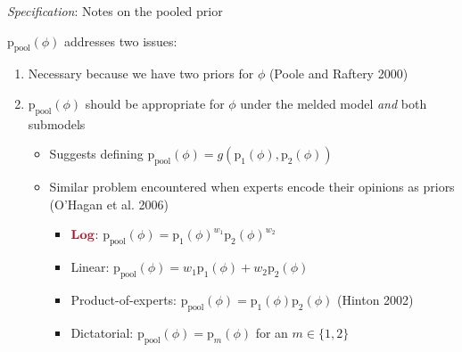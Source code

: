 \documentclass[10pt,ignorenonframetext,]{beamer}
\providecommand{\tightlist}{%
  \setlength{\itemsep}{0pt}\setlength{\parskip}{0pt}}
\newcommand{\pd}{\text{p}}
\newcommand{\ppoolphi}{\pd_{\text{pool}}(\phi)}
\newcommand{\modelindex}{m}
\begin{document}
\begin{frame}{\emph{Specification}: Notes on the pooled prior}

\(\ppoolphi\) addresses two issues:

\begin{enumerate}
\def\labelenumi{\arabic{enumi}.}
\tightlist
\item
  Necessary because we have two priors for \(\phi\) (Poole and Raftery
  2000) \vspace{0.5cm}
\item
  \(\ppoolphi\) should be appropriate for \(\phi\) under the melded
  model \emph{and} both submodels

  \begin{itemize}
  \tightlist
  \item
    Suggests defining \(\ppoolphi = g(\pd_{1}(\phi), \pd_{2}(\phi))\)
  \item
    Similar problem encountered when experts encode their opinions as
    priors (O'Hagan et al. 2006)

    \begin{itemize}
    \tightlist
    \item
      \(\textcolor{myredhighlight}{\textbf{Log}}\):
      \(\ppoolphi = \pd_{1}(\phi)^{w_{1}} \pd_{2}(\phi)^{w_{2}}\)
    \item
      Linear:
      \(\ppoolphi = {w_{1}}\pd_{1}(\phi) + {w_{2}}\pd_{2}(\phi)\)
      \vspace{0.25cm}
    \item
      Product-of-experts: \(\ppoolphi = \pd_{1}(\phi) \pd_{2}(\phi)\)
      (Hinton 2002)
    \item
      Dictatorial: \(\ppoolphi = \pd_{\modelindex}(\phi)\) for an
      \(\modelindex \in \{1, 2\}\)
    \end{itemize}
  \end{itemize}
\end{enumerate}

\end{frame}
\end{document}
